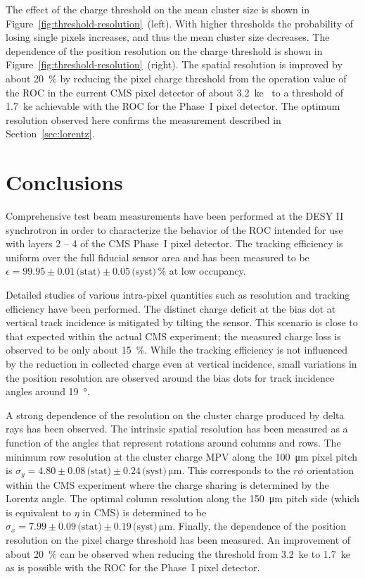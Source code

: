 \documentclass[a4paper,11pt]{article}
\newcommand{\SIERR}[4]{\ensuremath{\num{#1}\pm\num{#2}\,\text{(stat)}\pm\num{#3}\,\text{(syst)}\,\si{#4}}}
\begin{document}
The effect of the charge threshold on the mean cluster size is shown in Figure~\ref{fig:threshold-resolution}~(left).
With higher thresholds the probability of losing single pixels increases, and thus the mean cluster size decreases.
The dependence of the position resolution on the charge threshold is shown in Figure~\ref{fig:threshold-resolution}~(right).
The spatial resolution is improved by about \SI{20}{\percent} by reducing the pixel charge threshold from the operation value of the ROC in the current CMS pixel detector of about \SI{3.2}{ke}~\cite{tracker-reco} to a threshold of \SI{1.7}{ke} achievable with the ROC for the Phase~I pixel detector.
The optimum resolution observed here confirms the measurement described in Section~\ref{sec:lorentz}.


\section{Conclusions}
\label{sec:conclusion}

Comprehensive test beam measurements have been performed at the DESY II synchrotron in order to characterize the behavior of the ROC intended for use with layers 2 -- 4 of the CMS Phase~I pixel detector.
The tracking efficiency is uniform over the full fiducial sensor area and has been measured to be \mbox{$\epsilon = \SIERR{99.95}{0.01}{0.05}{\percent}$} at low occupancy.

Detailed studies of various intra-pixel quantities such as resolution and tracking efficiency have been performed.
The distinct charge deficit at the bias dot at vertical track incidence is mitigated by tilting the sensor.
This scenario is close to that expected within the actual CMS experiment; the measured charge loss is observed to be only about \SI{15}{\percent}.
While the tracking efficiency is not influenced by the reduction in collected charge even at vertical incidence, small variations in the position resolution are observed around the bias dots for track incidence angles around \SI{19}{\degree}.

A strong dependence of the resolution on the cluster charge produced by delta rays has been observed.
The intrinsic spatial resolution has been measured as a function of the angles that represent rotations around columns and rows.
The minimum row resolution at the cluster charge MPV along the \SI{100}{\um} pixel pitch is $\sigma_y = \SIERR{4.80}{0.08}{0.24}{\micro\meter}$.
This corresponds to the $r\phi$ orientation within the CMS experiment where the charge sharing is determined by the Lorentz angle.
The optimal column resolution along the \SI{150}{\um} pitch side (which is equivalent to $\eta$ in CMS) is determined to be $\sigma_x = \SIERR{7.99}{0.09}{0.19}{\micro\meter}$.
Finally, the dependence of the position resolution on the pixel charge threshold has been measured.
An improvement of about \SI{20}{\percent} can be observed when reducing the threshold from \SI{3.2}{ke} to \SI{1.7}{ke} as is possible with the ROC for the Phase~I pixel detector.
\end{document}

